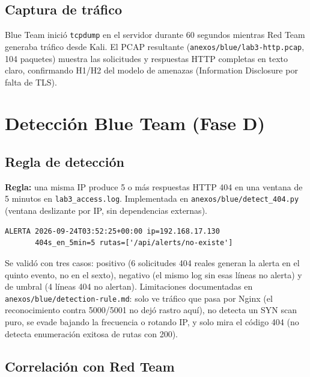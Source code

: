 \documentclass[journal]{IEEEtran}
\begin{document}
\subsection{Captura de tráfico}

Blue Team inició \texttt{tcpdump} en el servidor durante 60 segundos mientras
Red Team generaba tráfico desde Kali. El PCAP resultante
(\texttt{anexos/blue/lab3-http.pcap}, 104 paquetes) muestra las solicitudes
y respuestas HTTP completas en texto claro, confirmando H1/H2 del modelo de
amenazas (Information Disclosure por falta de TLS).

\section{Detección Blue Team (Fase D)}
\label{sec:blueteam}

\subsection{Regla de detección}

\textbf{Regla:} una misma IP produce 5 o más respuestas HTTP 404 en una
ventana de 5 minutos en \texttt{lab3\_access.log}. Implementada en
\texttt{anexos/blue/detect\_404.py} (ventana deslizante por IP, sin
dependencias externas).

\begin{lstlisting}[caption={Validación contra el log real (anexos/blue/detection\_rule\_result.txt)}]
ALERTA 2026-09-24T03:52:25+00:00 ip=192.168.17.130
       404s_en_5min=5 rutas=['/api/alerts/no-existe']
\end{lstlisting}

Se validó con tres casos: positivo (6 solicitudes 404 reales generan la
alerta en el quinto evento, no en el sexto), negativo (el mismo log sin esas
líneas no alerta) y de umbral (4 líneas 404 no alertan). Limitaciones
documentadas en \texttt{anexos/blue/detection-rule.md}: solo ve tráfico que
pasa por Nginx (el reconocimiento contra 5000/5001 no dejó rastro aquí),
no detecta un SYN scan puro, se evade bajando la frecuencia o rotando IP, y
solo mira el código 404 (no detecta enumeración exitosa de rutas con 200).

\subsection{Correlación con Red Team}
\end{document}

